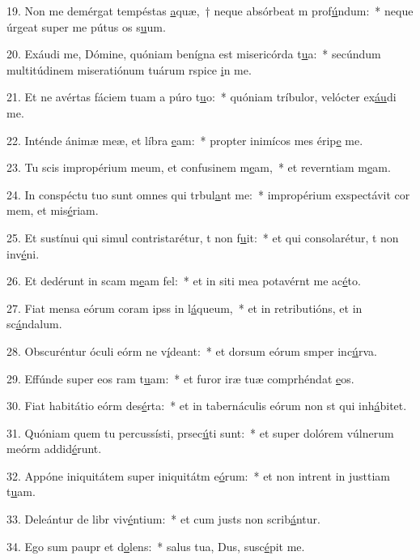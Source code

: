 19. Non me demérgat tempéstas \uline{a}quæ,~† neque absórbeat m prof\uline{ú}ndum:~* neque úrgeat super me pútus os s\uline{u}um.\par 
20. Exáudi me, Dómine, quóniam benígna est misericórda t\uline{u}a:~* secúndum multitúdinem miseratiónum tuárum rspice \uline{i}n me.\par 
21. Et ne avértas fáciem tuam a púro t\uline{u}o:~* quóniam tríbulor, velócter ex\uline{áu}di me.\par 
22. Inténde ánimæ meæ, et líbra \uline{e}am:~* propter inimícos mes érip\uline{e} me.\par 
23. Tu scis impropérium meum, et confusinem m\uline{e}am,~* et reverntiam m\uline{e}am.\par 
24. In conspéctu tuo sunt omnes qui trbul\uline{a}nt me:~* impropérium exspectávit cor mem, et mis\uline{é}riam.\par 
25. Et sustínui qui simul contristarétur, t non f\uline{u}it:~* et qui consolarétur, t non inv\uline{é}ni.\par 
26. Et dedérunt in scam m\uline{e}am fel:~* et in siti mea potavérnt me ac\uline{é}to.\par 
27. Fiat mensa eórum coram ipss in l\uline{á}queum,~* et in retributións, et in sc\uline{á}ndalum.\par 
28. Obscuréntur óculi eórm ne v\uline{í}deant:~* et dorsum eórum smper inc\uline{ú}rva.\par 
29. Effúnde super eos ram t\uline{u}am:~* et furor iræ tuæ comprhéndat \uline{e}os.\par 
30. Fiat habitátio eórm des\uline{é}rta:~* et in tabernáculis eórum non st qui inh\uline{á}bitet.\par 
31. Quóniam quem tu percussísti, prsec\uline{ú}ti sunt:~* et super dolórem vúlnerum meórm addid\uline{é}runt.\par 
32. Appóne iniquitátem super iniquitátm e\uline{ó}rum:~* et non intrent in justtiam t\uline{u}am.\par 
33. Deleántur de libr viv\uline{é}ntium:~* et cum justs non scrib\uline{á}ntur.\par 
34. Ego sum paupr et d\uline{o}lens:~* salus tua, Dus, susc\uline{é}pit me.\par 
